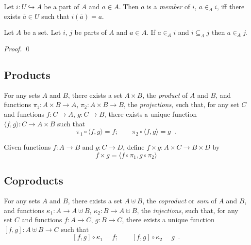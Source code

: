 \begin{df}[Membership]
 Let $i : U \hookrightarrow A$ be a part of $A$ and $a \in A$. Then $a$ is a
 \emph{member} of $i$, $a \in_A i$, iff there exists $\overline{a} \in U$ such that $i(\overline{a}) = a$.
\end{df}

\begin{prop}
 Let $A$ be a set. Let $i$, $j$ be parts of $A$ and $a \in A$. If $a \in_A i$
 and $i \subseteq_A j$ then $a \in_A j$.
\end{prop}

\begin{proof}
 \pf
 \qed
\end{proof}

\subsection{Products}

\begin{ax}[Products]
  For any sets $A$ and $B$, there exists a set $A \times B$, the
  \emph{product} of $A$ and $B$, and functions $\pi_1 : A \times B
  \rightarrow A$, $\pi_2 : A \times B \rightarrow B$, the \emph{projections},
  such that, for any set $C$ and functions $f : C \rightarrow A$, $g : C
  \rightarrow B$, there exists a unique function $\langle f, g \rangle : C
  \rightarrow A \times B$ such that
  \[ \pi_1 \circ \langle f, g \rangle = f; \qquad \pi_2 \circ \langle f,g
  \rangle
  = g \enspace . \]
\end{ax}

\begin{df}
  Given functions $f : A \rightarrow B$ and $g : C \rightarrow D$, define $f
  \times g : A \times C \rightarrow B \times D$ by
  \[ f \times g = \langle f \circ \pi_1, g \circ \pi_2 \rangle \]
\end{df}

\subsection{Coproducts}

\begin{ax}[Coproducts]
  For any sets $A$ and $B$, there exists a set $A \uplus B$, the
  \emph{coproduct} or \emph{sum} of $A$ and $B$, and functions $\kappa_1 : A
\rightarrow A
  \uplus B$, $\kappa_2 : B \rightarrow A \uplus B$, the \emph{injections},
  such that, for any set $C$ and functions $f : A \rightarrow C$, $g : B
  \rightarrow C$, there exists a unique function $[f, g] : A \uplus B
  \rightarrow
  C$ such that
  \[ [f,g] \circ \kappa_1 = f; \qquad [f,g] \circ \kappa_2 = g \enspace . \]
\end{ax}


